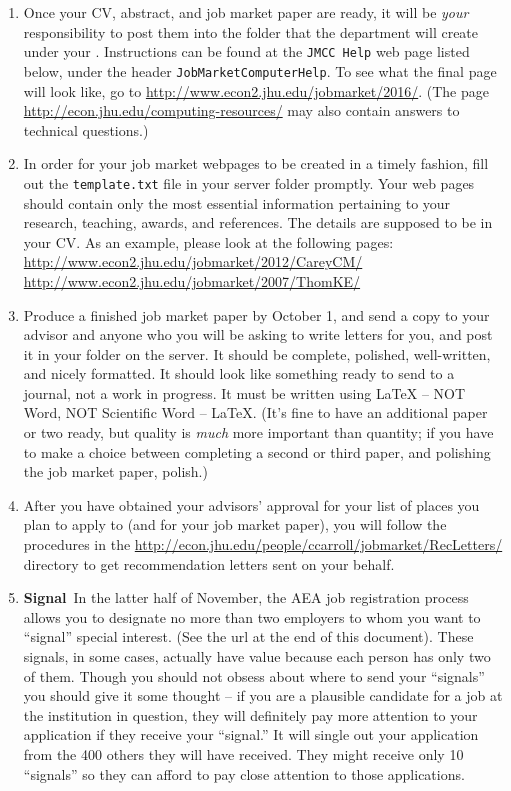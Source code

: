 \documentclass{econtex}
\begin{document}
\begin{enumerate}
\item Once your CV, abstract, and job market paper are ready, it will
  be {\it your} responsibility to post them into the folder that
  the department will create under your \Moniker.
  Instructions can be found at the \texttt{JMCC Help} web page listed
  below, under the header \texttt{JobMarketComputerHelp}.  To see what
  the final page will look like, go to
  \url{http://www.econ2.jhu.edu/jobmarket/2016/}.  (The page
  \url{http://econ.jhu.edu/computing-resources/}
  may also contain answers to technical questions.)
  
\item In order for your job market webpages to be created in a timely fashion, 
  fill out the \texttt{template.txt} file in your server folder promptly.
  Your web pages should contain only the most essential information 
  pertaining to your research, teaching, awards, and references. 
  The details are supposed to be in your CV.
  As an example, please look at the following pages:\\
  \url{http://www.econ2.jhu.edu/jobmarket/2012/CareyCM/}
  \url{http://www.econ2.jhu.edu/jobmarket/2007/ThomKE/}
  

\item Produce a finished job market paper by October 1, and send a copy to your advisor and anyone who you will be asking to write letters for you, and post it in your folder on the server.  It should be complete, polished, well-written, and nicely formatted.  It should look like something ready to send to a journal, not a work in progress.  It must be written using {\LaTeX} -- NOT Word, NOT Scientific Word -- {\LaTeX}.  (It's fine to have an additional paper or two ready, but quality is {\it much} more important than quantity; if you have to make a choice between completing a second or third paper, and polishing the job market paper, polish.)
  
\item After you have obtained your advisors' approval for your list of
  places you plan to apply to (and for your job market paper), you
  will follow the procedures in the
  \url{http://econ.jhu.edu/people/ccarroll/jobmarket/RecLetters/}
  directory to get recommendation letters sent on your behalf.
  
\item \ifdvi\hypertarget{Signal}{{\bf Signal}~}\fi In the latter half of November, the AEA job registration process 
  allows you to designate no more than two employers to whom you want
  to ``signal'' special interest.  (See the url at the end of this
  document).  These signals, in some cases, actually have value because 
each person has only two of them.  Though you should not obsess about 
where to send your ``signals'' you should give it some thought -- if you
are a plausible candidate for a job at the institution in question, they
will definitely pay more attention to your application if they receive your 
``signal.''  It will single out your application from the 400 others they will have received.
They might receive only 10 ``signals'' so they can afford to pay close attention
to those applications.
  

\end{enumerate}
\end{document}
